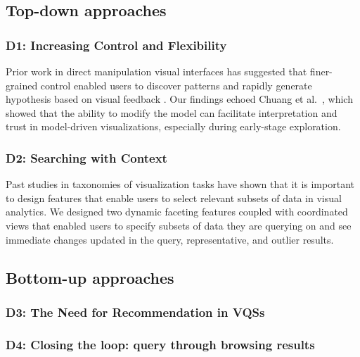 \subsection{Top-down approaches}
  \subsubsection{D1: Increasing Control and Flexibility}
  Prior work in direct manipulation visual interfaces has suggested that finer-grained control enabled users to discover patterns and rapidly generate hypothesis based on visual feedback \cite{Shneiderman1994,Shneiderman2007a}. Our findings echoed Chuang et al.~\cite{Chuang2012}, which showed that the ability to modify the model can facilitate interpretation and trust in model-driven visualizations, especially during early-stage exploration.
  \subsubsection{D2: Searching with Context}
  Past studies in taxonomies of visualization tasks have shown that it is important to design features that enable users to select relevant subsets of data in visual analytics\cite{Amar2005,Heer2012}. We designed two dynamic faceting features coupled with coordinated views that enabled users to specify subsets of data they are querying on and see immediate changes updated in the query, representative, and outlier results. 
\subsection{Bottom-up approaches}
  \subsubsection{D3: The Need for Recommendation in VQSs}
  \subsubsection{D4: Closing the loop: query through browsing results}
